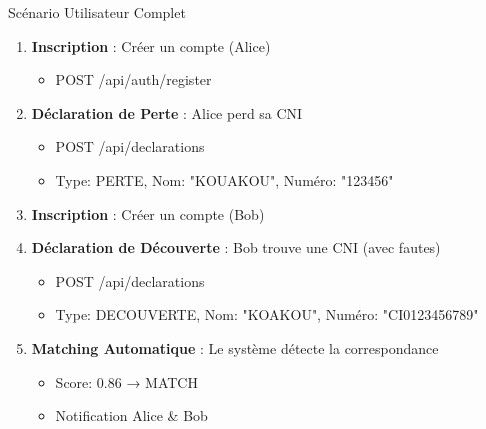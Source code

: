 \documentclass[aspectratio=169]{beamer}
\begin{document}
\begin{frame}{Scénario Utilisateur Complet}
    \begin{enumerate}
        \item \textbf{Inscription} : Créer un compte (Alice)
        \begin{itemize}
            \item POST /api/auth/register
        \end{itemize}

        \vspace{0.2cm}

        \item \textbf{Déclaration de Perte} : Alice perd sa CNI
        \begin{itemize}
            \item POST /api/declarations
            \item Type: PERTE, Nom: "KOUAKOU", Numéro: "123456"
        \end{itemize}

        \vspace{0.2cm}

        \item \textbf{Inscription} : Créer un compte (Bob)

        \vspace{0.2cm}

        \item \textbf{Déclaration de Découverte} : Bob trouve une CNI (avec fautes)
        \begin{itemize}
            \item POST /api/declarations
            \item Type: DECOUVERTE, Nom: "KOAKOU", Numéro: "CI0123456789"
        \end{itemize}

        \vspace{0.2cm}

        \item \textbf{Matching Automatique} : Le système détecte la correspondance
        \begin{itemize}
            \item Score: 0.86 → \textcolor{vertSucces}{\faCheckCircle} MATCH
            \item Notification Alice \& Bob
        \end{itemize}
    \end{enumerate}
\end{frame}
\end{document}

